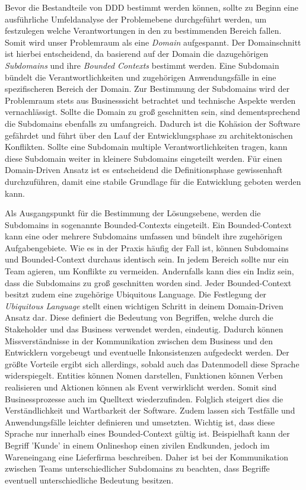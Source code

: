 Bevor die Bestandteile von DDD bestimmt werden können, sollte zu Beginn eine ausführliche Umfeldanalyse der Problemebene durchgeführt werden, um festzulegen welche Verantwortungen in den zu bestimmenden Bereich fallen. Somit wird unser Problemraum als eine \emph{Domain} aufgespannt. Der Domainschnitt ist hierbei entscheidend, da basierend auf der Domain die dazugehörigen \emph{Subdomains} und ihre \emph{Bounded Contexts} bestimmt werden. Eine Subdomain bündelt die Verantwortlichkeiten und zugehörigen Anwendungsfälle in eine spezifischeren Bereich der Domain. Zur Bestimmung der Subdomains wird der Problemraum stets aus Businesssicht betrachtet und technische Aspekte werden vernachlässigt. Sollte die Domain zu groß geschnitten sein, sind dementsprechend die Subdomains ebenfalls zu umfangreich. Dadurch ist die Kohäsion der Software gefährdet und führt über den Lauf der Entwicklungsphase zu architektonischen Konflikten. Sollte eine Subdomain multiple Verantwortlichkeiten tragen, kann diese Subdomain weiter in kleinere Subdomains eingeteilt werden. Für einen Domain-Driven Ansatz ist es entscheidend die Definitionsphase gewissenhaft durchzuführen, damit eine stabile Grundlage für die Entwicklung geboten werden kann. 

Als Ausgangspunkt für die Bestimmung der Lösungsebene, werden die Subdomains in sogenannte Bounded-Contexts eingeteilt. Ein Bounded-Context kann eine oder mehrere Subdomains umfassen und bündelt ihre zugehörigen Aufgabengebiete. Wie es in der Praxis häufig der Fall ist, können Subdomains und Bounded-Context durchaus identisch sein. In jedem Bereich sollte nur ein Team agieren, um Konflikte zu vermeiden. Andernfalls kann dies ein Indiz sein, dass die Subdomains zu groß geschnitten worden sind. Jeder Bounded-Context besitzt zudem eine zugehörige Ubiquitous Language. Die Festlegung der \emph{Ubiquitous Language} stellt einen wichtigen Schritt in deinem Domain-Driven Ansatz dar. Diese definiert die Bedeutung von Begriffen, welche durch die Stakeholder und das Business verwendet werden, eindeutig. Dadurch können Missverständnisse in der Kommunikation zwischen dem Business und den Entwicklern vorgebeugt und eventuelle Inkonsistenzen aufgedeckt werden. Der größte Vorteile ergibt sich allerdings, sobald auch das Datenmodell diese Sprache widerspiegelt. Entities können Nomen darstellen, Funktionen können Verben realisieren und Aktionen können als Event verwirklicht werden. Somit sind Businessprozesse auch im Quelltext wiederzufinden. Folglich steigert dies die Verständlichkeit und Wartbarkeit der Software. Zudem lassen sich Testfälle und Anwendungsfälle leichter definieren und umsetzten. Wichtig ist, dass diese Sprache nur innerhalb eines Bounded-Context gültig ist. Beispielhaft kann der Begriff 'Kunde' in einem Onlineshop einen zivilen Endkunden, jedoch im Wareneingang eine Lieferfirma beschreiben. Daher ist bei der Kommunikation zwischen Teams unterschiedlicher Subdomains zu beachten, dass Begriffe eventuell unterschiedliche Bedeutung besitzen. 

